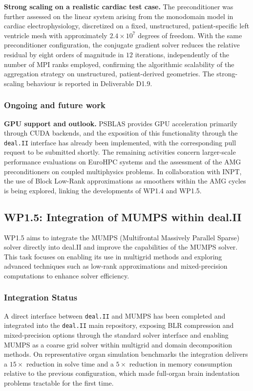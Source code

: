 \documentclass[a4paper,12pt, numbers]{article}
\newcommand{\dealii}{\texttt{deal.II}}
\begin{document}
\noindent\textbf{Strong scaling on a realistic cardiac test case.}
The preconditioner was further assessed on the linear system arising from the monodomain model in cardiac electrophysiology, discretized on a fixed, unstructured, patient-specific left ventricle mesh with approximately $2.4\times 10^{7}$ degrees of freedom. With the same preconditioner configuration, the conjugate gradient solver reduces the relative residual by eight orders of magnitude in $12$ iterations, independently of the number of MPI ranks employed, confirming the algorithmic scalability of the aggregation strategy on unstructured, patient-derived geometries. The strong-scaling behaviour is reported in Deliverable D1.9.

\subsubsection*{Ongoing and future work}

\noindent\textbf{GPU support and outlook.}
PSBLAS provides GPU acceleration primarily through CUDA backends, and the exposition of this functionality through the \dealii{} interface has already been implemented, with the corresponding pull request to be submitted shortly. The remaining activities concern larger-scale performance evaluations on EuroHPC systems and the assessment of the AMG preconditioners on coupled multiphysics problems. In collaboration with INPT, the use of Block Low-Rank approximations as smoothers within the AMG cycles is being explored, linking the developments of WP1.4 and WP1.5.
\subsection{WP1.5: Integration of MUMPS within deal.II} %
WP1.5 aims to integrate the MUMPS (Multifrontal Massively Parallel Sparse) solver directly into deal.II and improve the capabilities of the MUMPS solver. This task focuses on enabling its use in multigrid methods and exploring advanced techniques such as low-rank approximations and mixed-precision computations to enhance solver efficiency.


\subsubsection*{Integration Status}
A direct interface between \dealii{} and MUMPS has been completed and integrated into the \dealii{} main repository, exposing BLR compression and mixed-precision options through the standard solver interface and enabling MUMPS as a coarse grid solver within multigrid and domain decomposition methods. On representative organ simulation benchmarks the integration delivers a $15\times$ reduction in solve time and a $5\times$ reduction in memory consumption relative to the previous configuration, which made full-organ brain indentation problems tractable for the first time.
\end{document}
